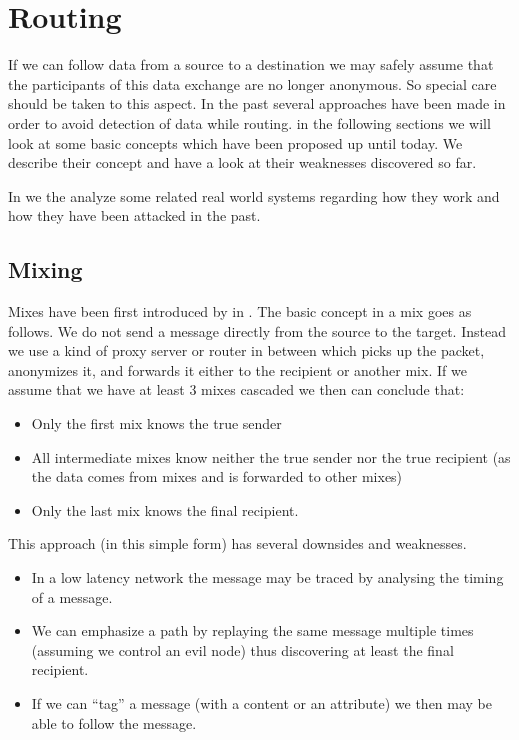 \section{Routing}
If we can follow data from a source to a destination we may safely assume that the participants of this data exchange are no longer anonymous. So special care should be taken to this aspect. In the past several approaches have been made in order to avoid detection of data while routing. in the following sections we will look at some basic concepts which have been proposed up until today. We describe their concept and have a look at their weaknesses discovered so far.

In  we the analyze some related real world systems regarding how they work and how they have been attacked in the past.

\subsection{Mixing\label{sec:mixnets}}
Mixes have been first introduced by \cite{CHAUM1} in \citeyear{CHAUM1}. The basic concept in a mix goes as follows. We do not send a message directly from the source to the target. Instead we use a kind of proxy server or router in between which picks up the packet, anonymizes it, and forwards it either to the recipient or another mix. If we assume that we have at least 3 mixes cascaded we then can conclude that:
\begin{itemize}
	\item Only the first mix knows the true sender
	\item All intermediate mixes know neither the true sender nor the true recipient (as the data comes from mixes and is forwarded to other mixes) 
	\item Only the last mix knows the final recipient.
\end{itemize}

This approach (in this simple form) has several downsides and weaknesses.

\begin{itemize}
	\item In a low latency network the message may be traced by analysing the timing of a message.
	\item We can emphasize a path by replaying the same message multiple times (assuming we control an evil node) thus discovering at least the final recipient.
	\item If we can ``tag'' a message (with a content or an attribute) we then may be able to follow the message.
\end{itemize}

